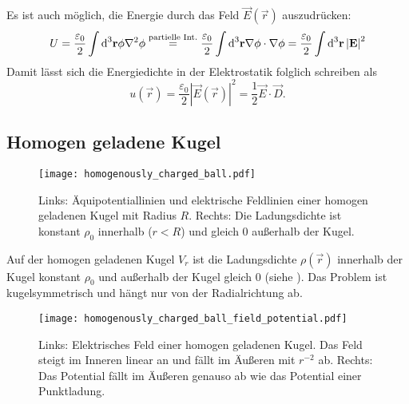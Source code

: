 Es ist auch möglich, die Energie durch das Feld $\vec {E}\left(\vec {r}\right)$ auszudrücken:
\begin{equation*}
	U=\frac{\varepsilon _{0}}{2}\int \text{d} ^{3}\mathbf{r}\phi \nabla ^{2}\phi \overset{\text{partielle Int}.}{=}\frac{\varepsilon _{0}}{2}\int \text{d} ^{3}\mathbf{r}\nabla \phi \cdot \nabla \phi =\frac{\varepsilon _{0}}{2}\int \text{d} ^{3}\mathbf{r}\left| \mathbf{E}\right| ^{2}
\end{equation*}
Damit lässt sich die Energiedichte in der Elektrostatik folglich schreiben als
\begin{equation*}
	u\left(\vec {r}\right)=\frac{\varepsilon _{0}}{2}\left| \vec {E}\left(\vec {r}\right)\right| ^{2}=\frac{1}{2}\vec {E}\cdot \vec {D}.
\end{equation*}



\subsection{Homogen geladene Kugel}

\begin{figure}[htb]
	\centering
	\texttt{[image: homogenously\_charged\_ball.pdf]}
	\caption{Links: Äquipotentiallinien und elektrische Feldlinien einer homogen geladenen Kugel mit Radius $R$. Rechts: Die Ladungsdichte ist konstant $\rho_0$ innerhalb ($r<R$) und gleich 0 außerhalb der Kugel. }
	\label{fig:homogenously_charged_ball}
\end{figure}

Auf der homogen geladenen Kugel $V_{r}$ ist die Ladungsdichte $\rho \left(\vec {r}\right)$ innerhalb der Kugel konstant $\rho _{0}$ und außerhalb der Kugel gleich $0$ (siehe ). Das Problem ist kugelsymmetrisch und hängt nur von der Radialrichtung ab.



\begin{figure}[htb]
	\centering
	\texttt{[image: homogenously\_charged\_ball\_field\_potential.pdf]}
	\caption{Links: Elektrisches Feld einer homogen geladenen Kugel. Das Feld steigt im Inneren linear an und fällt im Äußeren mit $r^{-2}$ ab. Rechts: Das Potential fällt im Äußeren genauso ab wie das Potential einer Punktladung. }
	\label{fig:homogenously_charged_ball_field_potential}
\end{figure}

